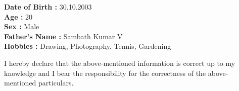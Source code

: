 \documentclass[11pt, a4paper]{article}
\begin{document}
    \par\noindent\dotfill
    \vspace*{-0.2cm}

    
    \small  %
    \begin{adjustwidth}{1cm}{}  %
       \small
       \textbf{Date of Birth :} 30.10.2003 \\
       \textbf{Age :} 20 \\
       \textbf{Sex :} Male \\
       \textbf{Father’s Name :} Sambath Kumar V \\
       \textbf{Hobbies :} Drawing, Photography, Tennis, Gardening \\
    \end{adjustwidth}

    \par\noindent\dotfill
    \vspace*{-0.2cm}


    \begin{adjustwidth}{1cm}{}
        \small
        I hereby declare that the above-mentioned information is correct up to my knowledge and I 
bear the responsibility for the correctness of the above-mentioned particulars.
    \end{adjustwidth}

    
\end{document}
